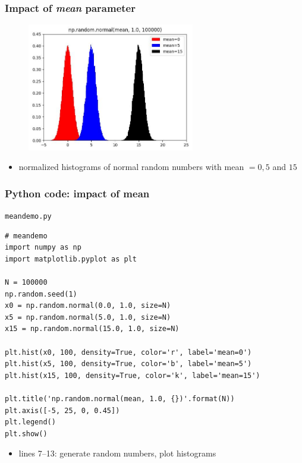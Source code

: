 \documentclass[english,14pt]{beamer}
\begin{document}
\begin{frame}[fragile]

\frametitle{Impact of \emph{mean} parameter}

\begin{figure}[ht]
	\centering
	\includegraphics[width=0.65\textwidth]{figures/meanDemoOutput}
\end{figure}

\vspace*{-5mm}

\begin{itemize}
	\item normalized histograms of normal random numbers with mean $=0, 5$ and $15$
\end{itemize}

\end{frame}


\begin{frame}[fragile]

\frametitle{Python code: impact of mean}

\vspace*{-3mm}

\texttt{meandemo.py}
\vspace*{-1mm}
\begin{lstlisting}[style=CStyle,basicstyle=\scriptsize]
# meandemo
import numpy as np
import matplotlib.pyplot as plt

N = 100000
np.random.seed(1)
x0 = np.random.normal(0.0, 1.0, size=N)
x5 = np.random.normal(5.0, 1.0, size=N)
x15 = np.random.normal(15.0, 1.0, size=N)

plt.hist(x0, 100, density=True, color='r', label='mean=0')
plt.hist(x5, 100, density=True, color='b', label='mean=5')
plt.hist(x15, 100, density=True, color='k', label='mean=15')

plt.title('np.random.normal(mean, 1.0, {})'.format(N))
plt.axis([-5, 25, 0, 0.45])
plt.legend()
plt.show()
\end{lstlisting}

\vspace*{-2mm}

\begin{itemize}
	\item lines 7--13: generate random numbers, plot histograms
\end{itemize}

\end{frame}
\end{document}
